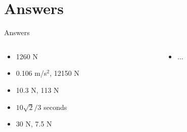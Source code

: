 \documentclass{beamer}
\begin{document}
\section{Answers}

\begin{frame}{Answers}
\begin{columns}[T]
\begin{column}{0.5\textwidth}
\begin{itemize}
\item 1260 N
\item 0.106 m/s$^2$, 12150 N
\item 10.3 N, 113 N
\item $10\sqrt{2}/3$ seconds
\item 30 N, 7.5 N
\end{itemize}
\end{column}
\begin{column}{0.5\textwidth}
\begin{itemize}
\item ...
\end{itemize}
\end{column}
\end{columns}
\end{frame}
\end{document}
